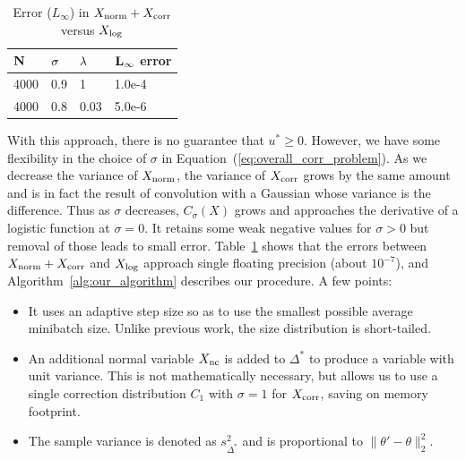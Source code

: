 \documentclass[twoside]{article} \usepackage{aistats2017}
\begin{document}
\begin{table}[t]
    \caption{Error ($L_\infty$) in $X_{\rm norm}+X_{\rm corr}$ versus $X_{\rm log}$}
    \label{tab:xcorr}
    \centering
    \begin{tabular}{l l l l}
    ${\bf N}$ & ${\bf \sigma}$ & ${\bf \lambda}$ & ${\bf L_{\infty}}$ {\bf error} \\
    \hline
    4000 & 0.9 & 1 & 1.0e-4  \\
    4000 & 0.8 & 0.03 & 5.0e-6 \\
    \end{tabular}
\end{table}

With this approach, there is no guarantee that $u^* \geq 0$. However, we have
some flexibility in the choice of $\sigma$ in Equation~(\ref{eq:overall_corr_problem}).
As we decrease the variance of $X_{\rm norm}$, the variance of $X_{\rm corr}$
grows by the same amount and is in fact the result of convolution with a
Gaussian whose variance is the difference.  Thus as $\sigma$ decreases,
$C_\sigma(X)$ grows and approaches the derivative of a logistic function at
$\sigma = 0$. It retains some weak negative values for $\sigma > 0$ but removal
of those leads to small error. Table~\ref{tab:xcorr} shows that the errors
between $X_{\rm norm}+X_{\rm corr}$ and $X_{\rm log}$ approach single floating
precision (about $10^{-7}$), and Algorithm~\ref{alg:our_algorithm} describes our
procedure. A few points:

\begin{itemize}[noitemsep]
    \item It uses an adaptive step size so as to use the smallest possible
    average minibatch size. Unlike previous work, the size distribution is
    short-tailed.

    \item An additional normal variable $X_{\rm nc}$ is added to $\Delta^*$ to
    produce a variable with unit variance. This is not mathematically necessary,
    but allows us to use a single correction distribution $C_1$ with $\sigma=1$
    for $X_{\rm corr}$, saving on memory footprint.

    \item The sample variance is denoted as $s^2_{\Delta^*}$ and is proportional
    to $\|\theta'-\theta\|_2^2$.
    
\end{itemize}
\end{document}
